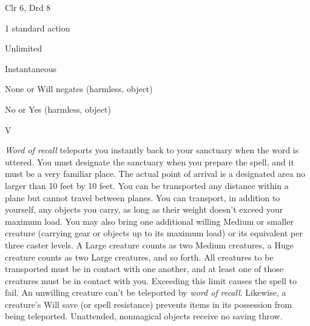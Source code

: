 
\begin{description*}
\item[Level:] Clr 6, Drd 8
\item[Casting Time:] 1 standard action
\item[Range:] Unlimited
\item[Duration:] Instantaneous
\item[Saving Throw:] None or Will negates (harmless, object)
\item[Spell Resistance:] No or Yes (harmless, object)
\item[Components:] V
\end{description*}

\textit{Word of recall} teleports you instantly back to your sanctuary when the
word is uttered. You must designate the sanctuary when you prepare the spell, and
it must be a very familiar place. The actual point of arrival is a designated area
no larger than 10 feet by 10 feet. You can be transported any distance within a
plane but cannot travel between planes. You can transport, in addition to yourself,
any objects you carry, as long as their weight doesn't exceed your maximum load.
You may also bring one additional willing Medium or smaller creature (carrying
gear or objects up to its maximum load) or its equivalent per three caster levels.
A Large creature counts as two Medium creatures, a Huge creature counts as two
Large creatures, and so forth. All creatures to be transported must be in contact
with one another, and at least one of those creatures must be in contact with you.
Exceeding this limit causes the spell to fail.
An unwilling creature can't be teleported by \textit{word of recall}. Likewise,
a creature's Will save (or spell resistance) prevents items in its possession from
being teleported. Unattended, nonmagical objects receive no saving throw.